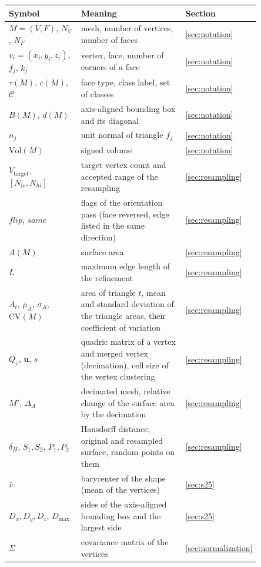 \documentclass[10pt,a4paper]{article}
\begin{document}
\begin{table}[htbp]\centering\small
\begin{tabular}{@{}p{0.30\linewidth}p{0.55\linewidth}l@{}}\toprule
Symbol & Meaning & Section\\\midrule
$M=(V,F)$, $N_V$, $N_F$ & mesh, number of vertices, number of faces & \ref{sec:notation}\\
$v_i=(x_i,y_i,z_i)$, $f_j$, $k_j$ & vertex, face, number of corners of a face & \ref{sec:notation}\\
$\tau(M)$, $c(M)$, $\mathcal{C}$ & face type, class label, set of classes & \ref{sec:notation}\\
$B(M)$, $d(M)$ & axis-aligned bounding box and its diagonal & \ref{sec:notation}\\
$n_j$ & unit normal of triangle $f_j$ & \ref{sec:notation}\\
$\mathrm{Vol}(M)$ & signed volume & \ref{sec:notation}\\
$V_{\text{target}}$, $[N_{lo},N_{hi}]$ & target vertex count and accepted range of the resampling & \ref{sec:resampling}\\
$\mathit{flip}$, $\mathit{same}$ & flags of the orientation pass (face reversed, edge listed in the same direction) & \ref{sec:resampling}\\
$A(M)$ & surface area & \ref{sec:resampling}\\
$L$ & maximum edge length of the refinement & \ref{sec:resampling}\\
$A_t$, $\mu_A$, $\sigma_A$, $\mathrm{CV}(M)$ & area of triangle $t$, mean and standard deviation of the triangle areas, their coefficient of variation & \ref{sec:resampling}\\
$Q_v$, $\mathbf u$, $s$ & quadric matrix of a vertex and merged vertex (decimation), cell size of the vertex clustering & \ref{sec:resampling}\\
$M'$, $\Delta_A$ & decimated mesh, relative change of the surface area by the decimation & \ref{sec:resampling}\\
$\delta_H$, $S_1,S_2$, $P_1,P_2$ & Hausdorff distance, original and resampled surface, random points on them & \ref{sec:resampling}\\
$\bar v$ & barycenter of the shape (mean of the vertices) & \ref{sec:s25}\\
$D_x,D_y,D_z$, $D_{\max}$ & sides of the axis-aligned bounding box and the largest side & \ref{sec:s25}\\
$\Sigma$ & covariance matrix of the vertices & \ref{sec:normalization}\\

\end{tabular}
\end{table}
\end{document}

